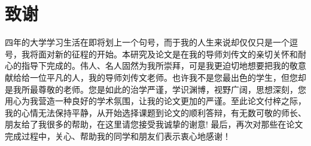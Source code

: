 \section*{致谢}
四年的大学学习生活在即将划上一个句号，而于我的人生来说却仅仅只是一个逗号，我将面对新的征程的开始。本研究及论文是在我的导师刘传文的亲切关怀和耐心的指导下完成的。伟人、名人固然为我所崇拜，可是我更迫切地想要把我的敬意献给给一位平凡的人，我的导师刘传文老师。也许我不是您最出色的学生，但您却是我所最尊敬的老师。您是如此的治学严谨，学识渊博，视野广阔，思想深刻，您用心为我营造一种良好的学术氛围，让我的论文更加的严谨。至此论文付梓之际，我的心情无法保持平静，从开始选择课题到论文的顺利答辩，有无数可敬的师长、朋友给了我很多的帮助，在这里请您接受我诚挚的谢意! 最后，再次对那些在论文完成过程中，关心、帮助我的同学和朋友们表示衷心地感谢！